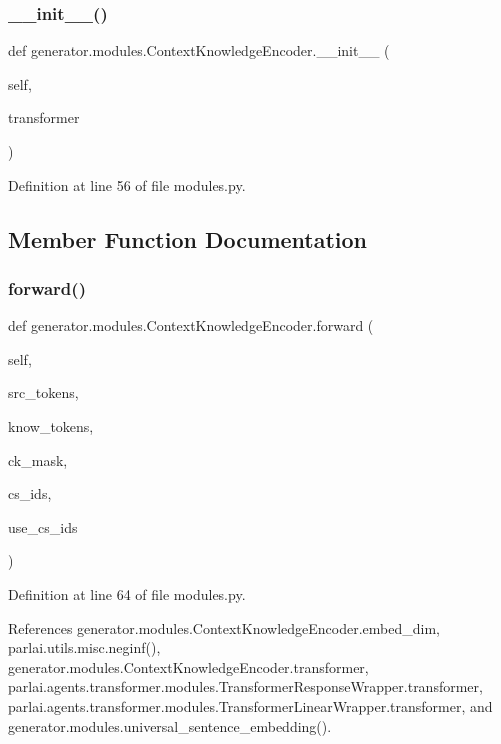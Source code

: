 \subsubsection{\texorpdfstring{\+\_\+\+\_\+init\+\_\+\+\_\+()}{\_\_init\_\_()}}
{\footnotesize\ttfamily def generator.\+modules.\+Context\+Knowledge\+Encoder.\+\_\+\+\_\+init\+\_\+\+\_\+ (\begin{DoxyParamCaption}\item[{}]{self,  }\item[{}]{transformer }\end{DoxyParamCaption})}



Definition at line 56 of file modules.\+py.



\subsection{Member Function Documentation}
\mbox{\label{classgenerator_1_1modules_1_1ContextKnowledgeEncoder_a131ee3cac93f38e5b5503ca43e62cf55}} 
\subsubsection{\texorpdfstring{forward()}{forward()}}
{\footnotesize\ttfamily def generator.\+modules.\+Context\+Knowledge\+Encoder.\+forward (\begin{DoxyParamCaption}\item[{}]{self,  }\item[{}]{src\+\_\+tokens,  }\item[{}]{know\+\_\+tokens,  }\item[{}]{ck\+\_\+mask,  }\item[{}]{cs\+\_\+ids,  }\item[{}]{use\+\_\+cs\+\_\+ids }\end{DoxyParamCaption})}



Definition at line 64 of file modules.\+py.



References generator.\+modules.\+Context\+Knowledge\+Encoder.\+embed\+\_\+dim, parlai.\+utils.\+misc.\+neginf(), generator.\+modules.\+Context\+Knowledge\+Encoder.\+transformer, parlai.\+agents.\+transformer.\+modules.\+Transformer\+Response\+Wrapper.\+transformer, parlai.\+agents.\+transformer.\+modules.\+Transformer\+Linear\+Wrapper.\+transformer, and generator.\+modules.\+universal\+\_\+sentence\+\_\+embedding().

